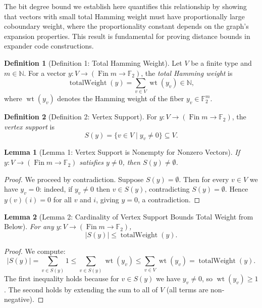 \documentclass[11pt]{article}
\theoremstyle{plain}
\newtheorem*{lemma}{Lemma}
\theoremstyle{definition}
\newtheorem*{definition}{Definition}
\theoremstyle{remark}
\begin{document}
The bit degree bound we establish here quantifies this relationship by showing that vectors with small total Hamming weight must have proportionally large coboundary weight, where the proportionality constant depends on the graph's expansion properties. This result is fundamental for proving distance bounds in expander code constructions.

\begin{definition}[Definition 1: Total Hamming Weight]
Let $V$ be a finite type and $m \in \mathbb{N}$. For a vector $y : V \to (\operatorname{Fin} m \to \mathbb{F}_2)$, the \emph{total Hamming weight} is
\[
\operatorname{totalWeight}(y) = \sum_{v \in V} \operatorname{wt}(y_v) \in \mathbb{N},
\]
where $\operatorname{wt}(y_v)$ denotes the Hamming weight of the fiber $y_v \in \mathbb{F}_2^m$.
\end{definition}

\begin{definition}[Definition 2: Vertex Support]
For $y : V \to (\operatorname{Fin} m \to \mathbb{F}_2)$, the \emph{vertex support} is
\[
S(y) = \{v \in V \mid y_v \neq 0\} \subseteq V.
\]
\end{definition}

\begin{lemma}[Lemma 1: Vertex Support is Nonempty for Nonzero Vectors]
If $y : V \to (\operatorname{Fin} m \to \mathbb{F}_2)$ satisfies $y \neq 0$, then $S(y) \neq \emptyset$.
\end{lemma}

\begin{proof}
We proceed by contradiction. Suppose $S(y) = \emptyset$. Then for every $v \in V$ we have $y_v = 0$: indeed, if $y_v \neq 0$ then $v \in S(y)$, contradicting $S(y) = \emptyset$. Hence $y(v)(i) = 0$ for all $v$ and $i$, giving $y = 0$, a contradiction.
\end{proof}

\begin{lemma}[Lemma 2: Cardinality of Vertex Support Bounds Total Weight from Below]
For any $y : V \to (\operatorname{Fin} m \to \mathbb{F}_2)$,
\[
|S(y)| \leq \operatorname{totalWeight}(y).
\]
\end{lemma}

\begin{proof}
We compute:
\[
|S(y)| = \sum_{v \in S(y)} 1 \leq \sum_{v \in S(y)} \operatorname{wt}(y_v) \leq \sum_{v \in V} \operatorname{wt}(y_v) = \operatorname{totalWeight}(y).
\]
The first inequality holds because for $v \in S(y)$ we have $y_v \neq 0$, so $\operatorname{wt}(y_v) \geq 1$. The second holds by extending the sum to all of $V$ (all terms are non-negative).
\end{proof}
\end{document}
